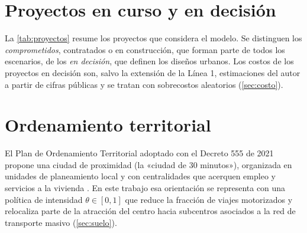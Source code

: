\section{Proyectos en curso y en decisión}

La \cref{tab:proyectos} resume los proyectos que considera el modelo. Se distinguen los
\emph{comprometidos}, contratados o en construcción, que forman parte de todos los escenarios, de los
\emph{en decisión}, que definen los diseños urbanos. Los costos de los proyectos en decisión son, salvo
la extensión de la Línea 1, estimaciones del autor a partir de cifras públicas y se tratan con
sobrecostos aleatorios (\cref{sec:costo}).

\begin{table}[ht]
\centering\small
\caption{Proyectos de la red modelada (CAPEX en billones de pesos de 2025).}\label{tab:proyectos}
\resizebox{\textwidth}{!}{}
\end{table}

\section{Ordenamiento territorial}

El Plan de Ordenamiento Territorial adoptado con el Decreto 555 de 2021 propone una ciudad de
proximidad (la «ciudad de 30 minutos»), organizada en unidades de planeamiento local y con
centralidades que acerquen empleo y servicios a la vivienda \citep{decreto555}. En este trabajo esa
orientación se representa con una política de intensidad $\theta\in[0,1]$ que reduce la fracción de
viajes motorizados y relocaliza parte de la atracción del centro hacia subcentros asociados a la red
de transporte masivo (\cref{sec:suelo}).
